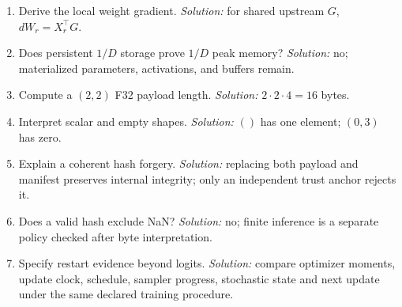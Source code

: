 \begin{enumerate}
contraction-axis sum; adding it on every owner multiplies it by $D$.
\item Derive the local weight gradient. \emph{Solution:} for shared upstream $G$,
$dW_r=X_r^\top G$.
\item Does persistent $1/D$ storage prove $1/D$ peak memory?
\emph{Solution:} no; materialized parameters, activations, and buffers remain.
\item Compute a $(2,2)$ F32 payload length. \emph{Solution:} $2\cdot2\cdot4=16$ bytes.
\item Interpret scalar and empty shapes. \emph{Solution:}
$()$ has one element; $(0,3)$ has zero.
\item Explain a coherent hash forgery. \emph{Solution:} replacing both payload and
manifest preserves internal integrity; only an independent trust anchor rejects it.
\item Does a valid hash exclude NaN? \emph{Solution:} no; finite inference is a
separate policy checked after byte interpretation.
\item Specify restart evidence beyond logits. \emph{Solution:} compare optimizer
moments, update clock, schedule, sampler progress, stochastic state and next update
under the same declared training procedure.
\end{enumerate}
